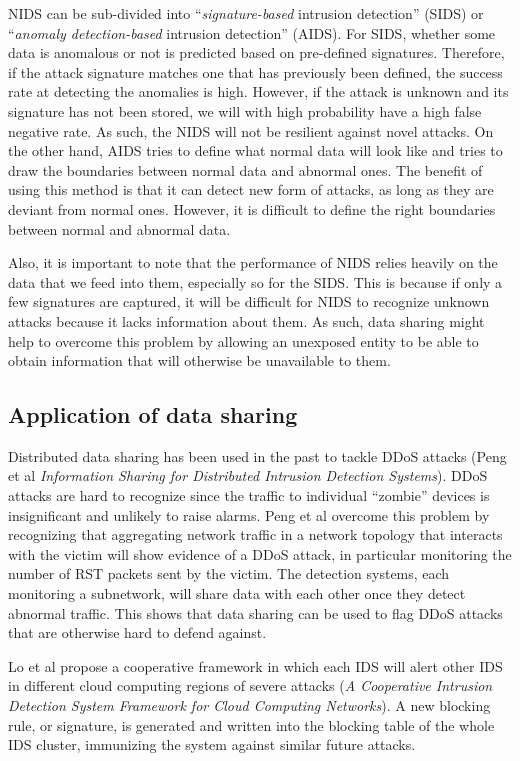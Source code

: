 \begin{background}
NIDS can be sub-divided into ``\textit{signature-based} intrusion detection'' (SIDS) or ``\textit{anomaly detection-based} intrusion detection'' (AIDS). For SIDS, whether some data is anomalous or not is predicted based on pre-defined signatures. Therefore, if the attack signature matches one that has previously been defined, the success rate at detecting the anomalies is high. However, if the attack is unknown and its signature has not been stored, we will with high probability have a high false negative rate. As such, the NIDS will not be resilient against novel attacks. On the other hand, AIDS tries to define what normal data will look like and tries to draw the boundaries between normal data and abnormal ones. The benefit of using this method is that it can detect new form of attacks, as long as they are deviant from normal ones. However, it is difficult to define the right boundaries between normal and abnormal data.

Also, it is important to note that the performance of NIDS relies heavily on the data that we feed into them, especially so for the SIDS. This is because if only a few signatures are captured, it will be difficult for NIDS to recognize unknown attacks because it lacks information about them. As such, data sharing might help to overcome this problem by allowing an unexposed entity to be able to obtain information that will otherwise be unavailable to them.

\subsection{Application of data sharing}
Distributed data sharing has been used in the past to tackle DDoS attacks (Peng et al \textit{Information Sharing for Distributed Intrusion Detection Systems}). DDoS attacks are hard to recognize since the traffic to individual ``zombie'' devices is insignificant and unlikely to raise alarms. Peng et al overcome this problem by recognizing that aggregating network traffic in a network topology that interacts with the victim will show evidence of a DDoS attack, in particular monitoring the number of RST packets sent by the victim. The detection systems, each monitoring a subnetwork, will share data with each other once they detect abnormal traffic. This shows that data sharing can be used to flag DDoS attacks that are otherwise hard to defend against.

Lo et al propose a cooperative framework in which each IDS will alert other IDS in different cloud computing regions of severe attacks (\textit{A Cooperative Intrusion Detection System Framework for Cloud Computing Networks}). A new blocking rule, or signature, is generated and written into the blocking table of the whole IDS cluster, immunizing the system against similar future attacks.


\end{background}
